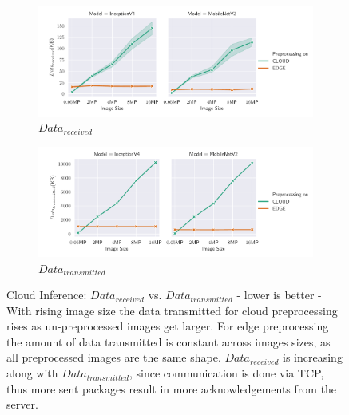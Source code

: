 \begin{figure}[!htb]
\centering
\begin{subfigure}[b]{0.95\textwidth}
   \includegraphics[width=1\linewidth]{./Bilder/single_plots/cloud_inference_plots/Cloud_Inference_Received_Data.pdf}
   \caption{$Data_{received}$}
   \label{fig:CloudInferenceReceivedData} 
\end{subfigure}

\begin{subfigure}[b]{0.95\textwidth}
   \includegraphics[width=1\linewidth]{./Bilder/single_plots/cloud_inference_plots/Cloud_Inference_Transmitted_Data.pdf}
   \caption{$Data_{transmitted}$}
   \label{fig:CloudInferenceTransmittedData}
\end{subfigure}

\caption[Cloud Inference:  $Data_{received}$ vs. $Data_{transmitted}$ - lower is better]{Cloud Inference:  $Data_{received}$ vs. $Data_{transmitted}$ - lower is better - 
With rising image size the data transmitted for cloud preprocessing rises as un-preprocessed images get larger.
For edge preprocessing the amount of data transmitted is constant across images sizes, as all preprocessed images are the same shape.
$Data_{received}$ is increasing along with $Data_{transmitted}$, since communication is done via TCP, thus more sent packages result in more acknowledgements from the server.
}
\end{figure}

\FloatBarrier
